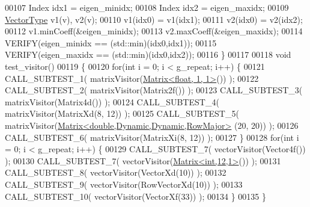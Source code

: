 \begin{DoxyCode}
00107   Index idx1 = eigen\_minidx;
00108   Index idx2 = eigen\_maxidx;
00109   \hyperlink{struct_vector_type}{VectorType} v1(v), v2(v);
00110   v1(idx0) = v1(idx1);
00111   v2(idx0) = v2(idx2);
00112   v1.minCoeff(&eigen\_minidx);
00113   v2.maxCoeff(&eigen\_maxidx);
00114   VERIFY(eigen\_minidx == (std::min)(idx0,idx1));
00115   VERIFY(eigen\_maxidx == (std::min)(idx0,idx2));
00116 \}
00117 
00118 \textcolor{keywordtype}{void} test\_visitor()
00119 \{
00120   \textcolor{keywordflow}{for}(\textcolor{keywordtype}{int} i = 0; i < g\_repeat; i++) \{
00121     CALL\_SUBTEST\_1( matrixVisitor(\hyperlink{group___core___module_class_eigen_1_1_matrix}{Matrix<float, 1, 1>}()) );
00122     CALL\_SUBTEST\_2( matrixVisitor(Matrix2f()) );
00123     CALL\_SUBTEST\_3( matrixVisitor(Matrix4d()) );
00124     CALL\_SUBTEST\_4( matrixVisitor(MatrixXd(8, 12)) );
00125     CALL\_SUBTEST\_5( matrixVisitor(\hyperlink{group___core___module_class_eigen_1_1_matrix}{Matrix<double,Dynamic,Dynamic,RowMajor>}
      (20, 20)) );
00126     CALL\_SUBTEST\_6( matrixVisitor(MatrixXi(8, 12)) );
00127   \}
00128   \textcolor{keywordflow}{for}(\textcolor{keywordtype}{int} i = 0; i < g\_repeat; i++) \{
00129     CALL\_SUBTEST\_7( vectorVisitor(Vector4f()) );
00130     CALL\_SUBTEST\_7( vectorVisitor(\hyperlink{group___core___module_class_eigen_1_1_matrix}{Matrix<int,12,1>}()) );
00131     CALL\_SUBTEST\_8( vectorVisitor(VectorXd(10)) );
00132     CALL\_SUBTEST\_9( vectorVisitor(RowVectorXd(10)) );
00133     CALL\_SUBTEST\_10( vectorVisitor(VectorXf(33)) );
00134   \}
00135 \}
\end{DoxyCode}
